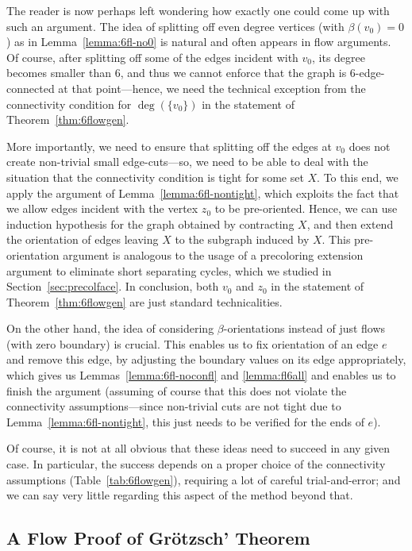 \documentclass[12pt,twoside,openright,a4paper]{book}
\begin{document}
The reader is now perhaps left wondering how exactly one could come up with such an argument.
The idea of splitting off even degree vertices (with $\beta(v_0)=0$) as in Lemma~\ref{lemma:6fl-no0} is natural
and often appears in flow arguments.  Of course, after splitting off some of the edges incident with $v_0$,
its degree becomes smaller than $6$, and thus we cannot enforce that the graph is $6$-edge-connected at that
point---hence, we need the technical exception from the connectivity condition for $\deg(\{v_0\})$ in
the statement of Theorem~\ref{thm:6flowgen}.

More importantly, we need to ensure that splitting off the edges at $v_0$
does not create non-trivial small edge-cuts---so, we need to be able to deal with the situation that the connectivity
condition is tight for some set $X$.  To this end, we apply the argument of Lemma~\ref{lemma:6fl-nontight},
which exploits the fact that we allow edges incident with the vertex $z_0$ to be pre-oriented.  Hence, we can
use induction hypothesis for the graph obtained by contracting $X$, and then extend the orientation of edges
leaving $X$ to the subgraph induced by $X$.  This pre-orientation argument is analogous to the usage
of a precoloring extension argument to eliminate short separating cycles, which we studied in Section~\ref{sec:precolface}.
In conclusion, both $v_0$ and $z_0$ in the statement of Theorem~\ref{thm:6flowgen} are just standard technicalities.

On the other hand, the idea of considering $\beta$-orientations instead of just flows (with zero boundary) is crucial.
This enables us to fix orientation of an edge $e$ and remove this edge, by adjusting the boundary values on its edge appropriately,
which gives us Lemmas~\ref{lemma:6fl-noconfl} and \ref{lemma:fl6all} and enables us to finish the argument
(assuming of course that this does not violate the connectivity assumptions---since non-trivial cuts are not tight due
to Lemma~\ref{lemma:6fl-nontight}, this just needs to be verified for the ends of $e$).

Of course, it is not at all obvious that these ideas need to succeed in any given case.  In particular,
the success depends on a proper choice of the connectivity assumptions (Table~\ref{tab:6flowgen}),
requiring a lot of careful trial-and-error; and we can say very little regarding this aspect of the method beyond that.

\subsection{A Flow Proof of Gr\"{o}tzsch' Theorem}
\end{document}

